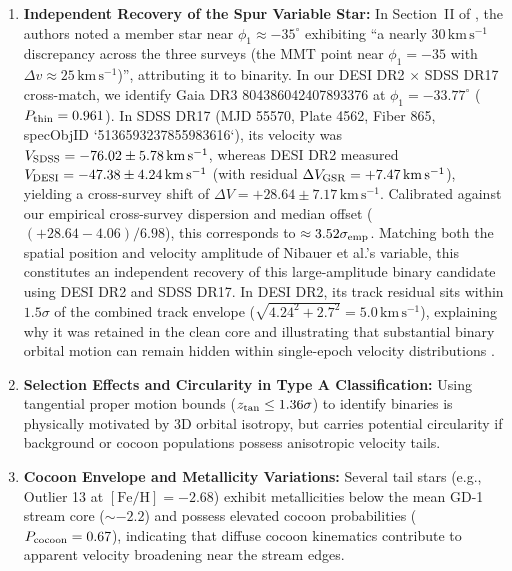 \documentclass[twocolumn]{aastex631}
\begin{document}
\begin{enumerate}
\item \textbf{Independent Recovery of the Spur Variable Star:} In Section~II of \citet{Nibauer2026}, the authors noted a member star near $\phi_1 \approx -35^\circ$ exhibiting ``a nearly $30\,\mathrm{km\,s^{-1}}$ discrepancy across the three surveys (the MMT point near $\phi_1 = -35$ with $\Delta v \approx 25\,\mathrm{km\,s^{-1}}$)'', attributing it to binarity. In our DESI DR2 $\times$ SDSS DR17 cross-match, we identify Gaia DR3 804386042407893376 at $\phi_1 = -33.77^\circ$ ($P_{\rm thin} = 0.961$). In SDSS DR17 (MJD 55570, Plate 4562, Fiber 865, specObjID `5136593237855983616`), its velocity was $V_{\rm SDSS} = -76.02 \pm 5.78\,\mathrm{km\,s^{-1}}$, whereas DESI DR2 measured $V_{\rm DESI} = -47.38 \pm 4.24\,\mathrm{km\,s^{-1}}$ (with residual $\Delta V_{\rm GSR} = +7.47\,\mathrm{km\,s^{-1}}$), yielding a cross-survey shift of $\Delta V = +28.64 \pm 7.17\,\mathrm{km\,s^{-1}}$. Calibrated against our empirical cross-survey dispersion and median offset ($(+28.64 - 4.06)/6.98$), this corresponds to $\approx 3.52\sigma_{\rm emp}$. Matching both the spatial position and velocity amplitude of Nibauer et al.'s variable, this constitutes an independent recovery of this large-amplitude binary candidate using DESI DR2 and SDSS DR17. In DESI DR2, its track residual sits within $1.5\sigma$ of the combined track envelope ($\sqrt{4.24^2 + 2.7^2} = 5.0\,\mathrm{km\,s^{-1}}$), explaining why it was retained in the clean core and illustrating that substantial binary orbital motion can remain hidden within single-epoch velocity distributions \citep[see also][]{Phillips2026}.
\item \textbf{Selection Effects and Circularity in Type A Classification:} Using tangential proper motion bounds ($z_{\rm tan} \le 1.36\sigma$) to identify binaries is physically motivated by 3D orbital isotropy, but carries potential circularity if background or cocoon populations possess anisotropic velocity tails.
\item \textbf{Cocoon Envelope and Metallicity Variations:} Several tail stars (e.g., Outlier 13 at $\mathrm{[Fe/H]} = -2.68$) exhibit metallicities below the mean GD-1 stream core ($\sim -2.2$) and possess elevated cocoon probabilities ($P_{\rm cocoon} = 0.67$), indicating that diffuse cocoon kinematics contribute to apparent velocity broadening near the stream edges.
\end{enumerate}
\end{document}
